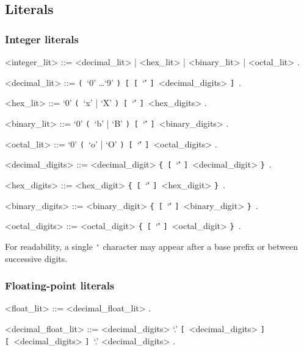 \documentclass{article}
\def\lrep{\synshortsoff\texttt{\{}\synshorts~}
\def\rrep{\synshortsoff\texttt{\}}\synshorts~}
\def\lopt{\synshortsoff\texttt{[}\synshorts~}
\def\ropt{\synshortsoff\texttt{]}\synshorts~}
\def\lgrp{\synshortsoff\texttt{(}\synshorts~}
\def\rgrp{\synshortsoff\texttt{)}\synshorts~}
\begin{document}
\subsection*{Literals}
\subsubsection*{Integer literals}
\begin{grammar}
  <integer_lit> ::= <decimal_lit> | <hex_lit> | <binary_lit> | <octal_lit> .

  <decimal_lit> ::= \lgrp `0' \ldots `9' \rgrp \lopt \lopt `\'' \ropt <decimal_digits> \ropt .

  <hex_lit> ::= `0' \lgrp `x' | `X' \rgrp \lopt `\'' \ropt <hex_digits> .

  <binary_lit> ::= `0' \lgrp `b' | `B' \rgrp \lopt `\'' \ropt <binary_digits> .

  <octal_lit> ::= `0' \lgrp `o' | `O' \rgrp \lopt `\'' \ropt <octal_digits> .

  <decimal_digits> ::= <decimal_digit> \lrep \lopt `\'' \ropt <decimal_digit> \rrep .

  <hex_digits> ::= <hex_digit> \lrep \lopt `\'' \ropt <hex_digit> \rrep .

  <binary_digits> ::= <binary_digit> \lrep \lopt `\'' \ropt <binary_digit> \rrep .

  <octal_digits> ::= <octal_digit> \lrep \lopt `\'' \ropt <octal_digit> \rrep .
\end{grammar}

For readability, a single \texttt{\'} character may appear after a base prefix or between successive digits.

\subsubsection*{Floating-point literals}
\begin{grammar}
  <float_lit> ::= <decimal_float_lit> . %

  <decimal_float_lit> ::= <decimal_digits> `.' \lopt <decimal_digits> \ropt
  \alt \lopt <decimal_digits> \ropt `.' <decimal_digits> .

\end{grammar}
\end{document}
